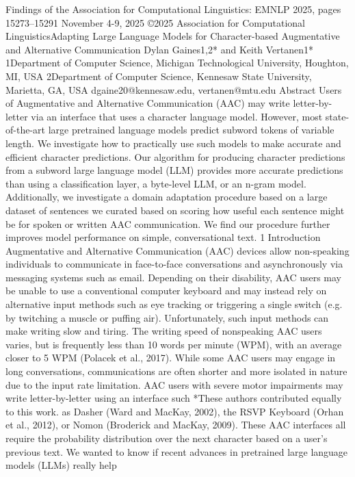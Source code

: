 Findings of the Association for Computational Linguistics: EMNLP 2025, pages 15273–15291
November 4-9, 2025 ©2025 Association for Computational LinguisticsAdapting Large Language Models for Character-based Augmentative and
Alternative Communication
Dylan Gaines1,2* and Keith Vertanen1*
1Department of Computer Science, Michigan Technological University, Houghton, MI, USA
2Department of Computer Science, Kennesaw State University, Marietta, GA, USA
dgaine20@kennesaw.edu, vertanen@mtu.edu
Abstract
Users of Augmentative and Alternative Communication (AAC) may write letter-by-letter
via an interface that uses a character language
model. However, most state-of-the-art large
pretrained language models predict subword
tokens of variable length. We investigate how
to practically use such models to make accurate and efficient character predictions. Our
algorithm for producing character predictions
from a subword large language model (LLM)
provides more accurate predictions than using
a classification layer, a byte-level LLM, or an
n-gram model. Additionally, we investigate a
domain adaptation procedure based on a large
dataset of sentences we curated based on scoring how useful each sentence might be for spoken or written AAC communication. We find
our procedure further improves model performance on simple, conversational text.
1 Introduction
Augmentative and Alternative Communication
(AAC) devices allow non-speaking individuals to
communicate in face-to-face conversations and
asynchronously via messaging systems such as
email. Depending on their disability, AAC users
may be unable to use a conventional computer keyboard and may instead rely on alternative input
methods such as eye tracking or triggering a single switch (e.g. by twitching a muscle or puffing
air). Unfortunately, such input methods can make
writing slow and tiring. The writing speed of nonspeaking AAC users varies, but is frequently less
than 10 words per minute (WPM), with an average
closer to 5 WPM (Polacek et al., 2017).
While some AAC users may engage in long conversations, communications are often shorter and
more isolated in nature due to the input rate limitation. AAC users with severe motor impairments
may write letter-by-letter using an interface such
*These authors contributed equally to this work.
as Dasher (Ward and MacKay, 2002), the RSVP
Keyboard (Orhan et al., 2012), or Nomon (Broderick and MacKay, 2009). These AAC interfaces
all require the probability distribution over the next
character based on a user’s previous text.
We wanted to know if recent advances in pretrained large language models (LLMs) really help
